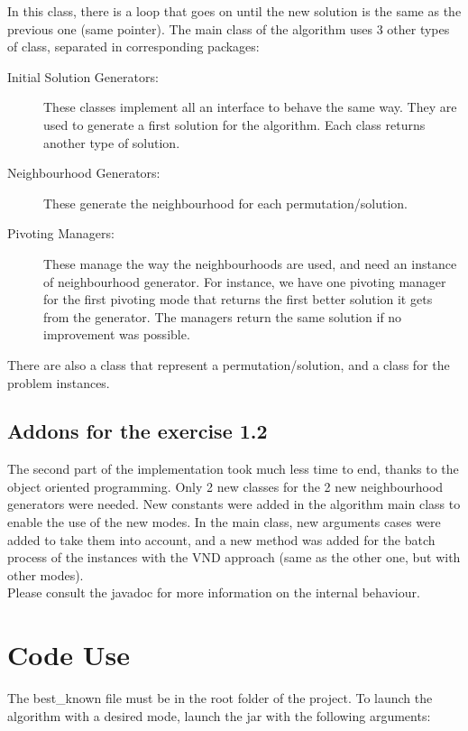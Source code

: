In this class, there is a loop that goes on until the new solution is the same as the previous one (same pointer). The main class of the algorithm uses 3 other types of class, separated in corresponding packages:
\begin{description}
	\item[Initial Solution Generators:] These classes implement all an interface to behave the same way. They are used to generate a first solution for the algorithm. Each class returns another type of solution.

	\item[Neighbourhood Generators:] These generate the neighbourhood for each permutation/solution.
	\item[Pivoting Managers:] These manage the way the neighbourhoods are used, and need an instance of neighbourhood generator. For instance, we have one pivoting manager for the first pivoting mode that returns the first better solution it gets from the generator. The managers return the same solution if no improvement was possible.
\end{description}

There are also a class that represent a permutation/solution, and a class for the problem instances.\\

\subsection{Addons for the exercise 1.2}
The second part of the implementation took much less time to end, thanks to the object oriented programming. Only 2 new classes for the 2 new neighbourhood generators were needed. New constants were added in the algorithm main class to enable the use of the new modes. In the main class, new arguments cases were added to take them into account, and a new method was added for the batch process of the instances with the VND approach (same as the other one, but with other modes).\\

Please consult the javadoc for more information on the internal behaviour.

\section{Code Use}
The best\_known file must be in the root folder of the project. To launch the algorithm with a desired mode, launch the jar with the following arguments:

